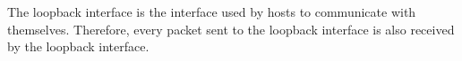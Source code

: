 The loopback interface is the interface used by hosts to communicate with themselves. Therefore, every packet sent to the loopback interface is also received by the loopback interface.
